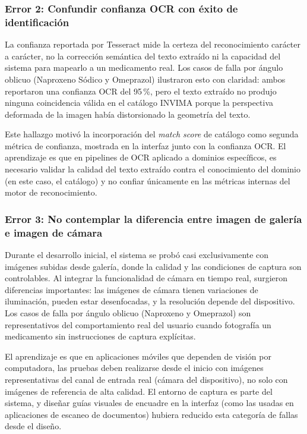 \subsubsection*{Error 2: Confundir confianza OCR con éxito de identificación}

La confianza reportada por Tesseract mide la certeza del reconocimiento carácter a carácter, no la corrección semántica del texto extraído ni la capacidad del sistema para mapearlo a un medicamento real. Los casos de falla por ángulo oblicuo (Naproxeno Sódico y Omeprazol) ilustraron esto con claridad: ambos reportaron una confianza OCR del 95\,\%, pero el texto extraído no produjo ninguna coincidencia válida en el catálogo INVIMA porque la perspectiva deformada de la imagen había distorsionado la geometría del texto.

Este hallazgo motivó la incorporación del \textit{match score} de catálogo como segunda métrica de confianza, mostrada en la interfaz junto con la confianza OCR. El aprendizaje es que en pipelines de OCR aplicado a dominios específicos, es necesario validar la calidad del texto extraído contra el conocimiento del dominio (en este caso, el catálogo) y no confiar únicamente en las métricas internas del motor de reconocimiento.

\subsubsection*{Error 3: No contemplar la diferencia entre imagen de galería e imagen de cámara}

Durante el desarrollo inicial, el sistema se probó casi exclusivamente con imágenes subidas desde galería, donde la calidad y las condiciones de captura son controlables. Al integrar la funcionalidad de cámara en tiempo real, surgieron diferencias importantes: las imágenes de cámara tienen variaciones de iluminación, pueden estar desenfocadas, y la resolución depende del dispositivo. Los casos de falla por ángulo oblicuo (Naproxeno y Omeprazol) son representativos del comportamiento real del usuario cuando fotografía un medicamento sin instrucciones de captura explícitas.

El aprendizaje es que en aplicaciones móviles que dependen de visión por computadora, las pruebas deben realizarse desde el inicio con imágenes representativas del canal de entrada real (cámara del dispositivo), no solo con imágenes de referencia de alta calidad. El entorno de captura es parte del sistema, y diseñar guías visuales de encuadre en la interfaz (como las usadas en aplicaciones de escaneo de documentos) hubiera reducido esta categoría de fallas desde el diseño.

